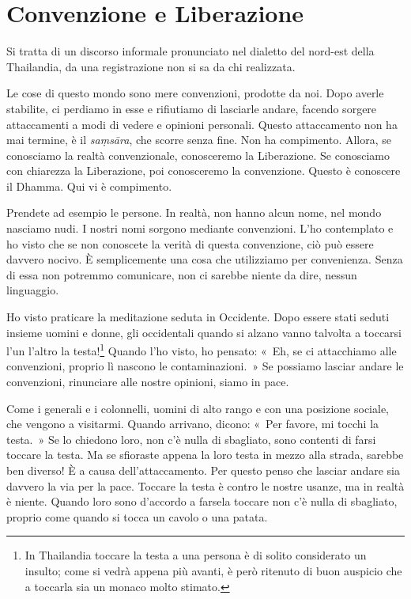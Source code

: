 \chapter{Convenzione e Liberazione}

\begin{openingQuote}
  Si tratta di un discorso informale pronunciato nel dialetto del nord-est della
  Thailandia, da una registrazione non si sa da chi realizzata.
\end{openingQuote}

Le cose di questo mondo sono mere convenzioni, prodotte da noi. Dopo
averle stabilite, ci perdiamo in esse e rifiutiamo di lasciarle andare,
facendo sorgere attaccamenti a modi di vedere e opinioni personali.
Questo attaccamento non ha mai termine, è il \emph{saṃsāra}, che scorre
senza fine. Non ha compimento. Allora, se conosciamo la realtà
convenzionale, conosceremo la Liberazione. Se conosciamo con chiarezza
la Liberazione, poi conosceremo la convenzione. Questo è conoscere il
Dhamma. Qui vi è compimento.

Prendete ad esempio le persone. In realtà, non hanno alcun nome, nel
mondo nasciamo nudi. I nostri nomi sorgono mediante convenzioni. L'ho
contemplato e ho visto che se non conoscete la verità di questa
convenzione, ciò può essere davvero nocivo. È semplicemente una cosa che
utilizziamo per convenienza. Senza di essa non potremmo comunicare, non
ci sarebbe niente da dire, nessun linguaggio.

Ho visto praticare la meditazione seduta in Occidente. Dopo essere stati
seduti insieme uomini e donne, gli occidentali quando si alzano vanno
talvolta a toccarsi l'un l'altro la testa!\footnote{In Thailandia
  toccare la testa a una persona è di solito considerato un insulto;
  come si vedrà appena più avanti, è però ritenuto di buon auspicio che
  a toccarla sia un monaco molto stimato.} Quando l'ho visto, ho
pensato: «~Eh, se ci attacchiamo alle convenzioni, proprio lì nascono le
contaminazioni.~» Se possiamo lasciar andare le convenzioni, rinunciare
alle nostre opinioni, siamo in pace.

Come i generali e i colonnelli, uomini di alto rango e con una posizione
sociale, che vengono a visitarmi. Quando arrivano, dicono: «~Per favore,
mi tocchi la testa.~» Se lo chiedono loro, non c'è nulla di sbagliato,
sono contenti di farsi toccare la testa. Ma se sfioraste appena la loro
testa in mezzo alla strada, sarebbe ben diverso! È a causa
dell'attaccamento. Per questo penso che lasciar andare sia davvero la
via per la pace. Toccare la testa è contro le nostre usanze, ma in
realtà è niente. Quando loro sono d'accordo a farsela toccare non c'è
nulla di sbagliato, proprio come quando si tocca un cavolo o una patata.

